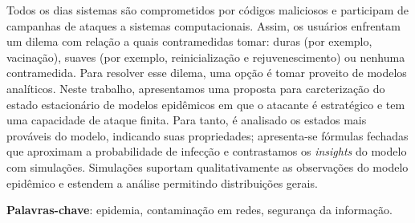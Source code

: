 
\setlength{\absparsep}{18pt} %
\begin{resumo}
Todos os dias sistemas são comprometidos por códigos maliciosos e  participam de campanhas de ataques a sistemas computacionais. 
Assim, os usuários enfrentam um dilema com relação a quais contramedidas tomar: duras (por exemplo, vacinação), suaves (por exemplo, reinicialização e rejuvenescimento) ou nenhuma contramedida. Para resolver esse dilema, uma opção é tomar proveito de  modelos analíticos. Neste trabalho, apresentamos uma proposta para carcterização do estado estacionário de modelos epidêmicos em que o atacante é estratégico e tem uma capacidade de ataque finita. Para tanto, é analisado os estados mais prováveis do modelo, indicando suas propriedades; apresenta-se fórmulas fechadas que  aproximam a probabilidade de infecção e contrastamos os \emph{insights} do modelo com simulações. Simulações suportam qualitativamente as observações do modelo epidêmico e estendem a análise permitindo distribuições gerais.

 \textbf{Palavras-chave}: epidemia, contaminação em redes, segurança da informação.
\end{resumo}